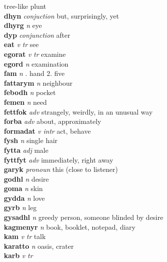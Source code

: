 tree-like plunt\\\textbf{dhyn}   \emph{conjuction} \textperiodcentered but, surprisingly, yet\\\textbf{dhyrg}   \emph{n} \textperiodcentered eye\\\textbf{dyp}   \emph{conjunction} \textperiodcentered after\\\textbf{eat}   \emph{v tr} \textperiodcentered see\\\textbf{egorat}   \emph{v tr} \textperiodcentered examine\\\textbf{egord}   \emph{n} \textperiodcentered examination\\\textbf{fam}   \emph{n} . hand 2. five \\\textbf{fattarym}   \emph{n} \textperiodcentered neighbour\\\textbf{febodh}   \emph{n} \textperiodcentered pocket\\\textbf{femen}   \emph{n} \textperiodcentered need\\\textbf{fettfok}   \emph{adv} \textperiodcentered strangely, weirdly, in an unusual way\\\textbf{forba}   \emph{adv} \textperiodcentered about, approximately\\\textbf{formadat}   \emph{v intr} \textperiodcentered act, behave\\\textbf{fysh}   \emph{n} \textperiodcentered single hair\\\textbf{fytta}   \emph{adj} \textperiodcentered male\\\textbf{fyttfyt}   \emph{adv} \textperiodcentered immediately, right away\\\textbf{garyk}   \emph{pronoun} \textperiodcentered this (close to listener)\\\textbf{godhl}   \emph{n} \textperiodcentered desire\\\textbf{goma}   \emph{n} \textperiodcentered skin\\\textbf{gydda}   \emph{n} \textperiodcentered love\\\textbf{gyrb}   \emph{n} \textperiodcentered leg\\\textbf{gysadhl}   \emph{n} \textperiodcentered greedy person, someone blinded by desire\\\textbf{kagmenyr}   \emph{n} \textperiodcentered book, booklet, notepad, diary\\\textbf{kam}   \emph{v tr} \textperiodcentered talk\\\textbf{karatto}   \emph{n} \textperiodcentered oasis, crater\\\textbf{karb}   \emph{v tr} \textperiodcentered 